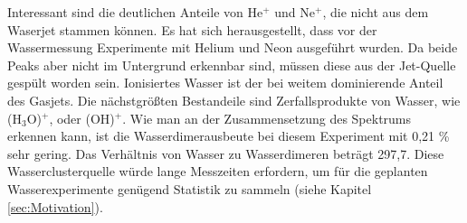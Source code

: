 \begin{center}
\begin{table}[H]
 \caption{Auswertung der Ionenanteile aus Abbildung \ref{fig:TOFJet}. Die Zeile \enquote{Untergrund} fasst schwach ausgeprägte und/oder sehr breite Peaks (N$^+$, O$^+$, O$_2^+$ etc.) im Diagramm mit Ortsbedingung auf dem Jet zusammen.} \label{tab:Antile}
\end{table}
\end{center} 
Interessant sind die deutlichen Anteile von He$^+$ und Ne$^+$, die nicht aus dem Waserjet stammen können. Es hat sich herausgestellt, dass vor der Wassermessung Experimente mit Helium und Neon ausgeführt wurden. Da beide Peaks aber nicht im Untergrund erkennbar sind, müssen diese aus der Jet-Quelle gespült worden sein. Ionisiertes Wasser ist der bei weitem dominierende Anteil des Gasjets. Die nächstgrößten Bestandeile sind Zerfallsprodukte von Wasser, wie (H$_3$O)$^+$, oder (OH)$^+$. Wie man an der Zusammensetzung des Spektrums erkennen kann, ist die Wasserdimerausbeute bei diesem Experiment mit 0,21 \% sehr gering. Das Verhältnis von Wasser zu Wasserdimeren beträgt 297,7. Diese Wasserclusterquelle würde lange Messzeiten erfordern, um für die geplanten Wasserexperimente genügend Statistik zu sammeln (siehe Kapitel \ref{sec:Motivation}).
\newpage

